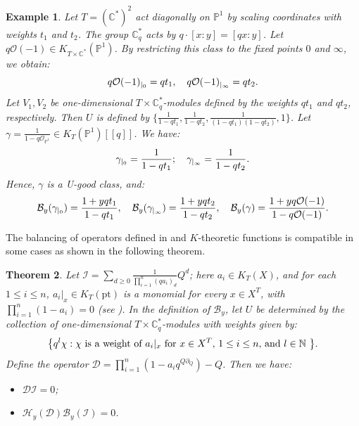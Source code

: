 \documentclass{amsart}
\newtheorem{thm}{Theorem}[section]
\newtheorem{example}[thm]{Example}
\begin{document}
\begin{example}
    Let $T=(\mathbb{C}^*)^2$ act diagonally on $\mathbb{P}^1$ by scaling coordinates with weights $t_1$ and $t_2$. The group $\mathbb{C}^*_q$ acts by $q \cdot [x:y] = [qx:y]$. Let $q\mathcal{O}(-1) \in K_{T \times \mathbb{C}^*}(\mathbb{P}^1)$. By restricting this class to the fixed points $0$ and $\infty$, we obtain:
    \[
     q\mathcal{O}(-1)_{{\arrowvert}_0} = qt_1, \quad q\mathcal{O}(-1)_{{\arrowvert}_{\infty}} = qt_2.
    \]
     Let $V_1, V_2$ be one-dimensional $T \times \mathbb{C}^*_q$-modules defined by the weights $qt_1$ and $qt_2$, respectively. 
    Then $U$ is defined by $\{ \frac{1}{1-qt_1}, \frac{1}{1-qt_2} ,\frac{1}{(1-qt_1)(1-qt_2)},1 \}$. Let $\gamma = \frac{1}{1-q\mathcal{O}_{\mathbb{P}^1}} \in K_{T}(\mathbb{P}^1)[[q]]$. We have:
    \[
    \gamma_{{\arrowvert}_{0}} = \frac{1}{1-qt_1}; \quad \gamma_{{\arrowvert}_{\infty}} = \frac{1}{1-qt_2}.
    \]
    Hence, $\gamma$ is a U-good class, and:
    \[
    \mathcal{B}_y(\gamma_{{\arrowvert}_{0}}) = \frac{1+yqt_1}{1-qt_1}, \quad \mathcal{B}_y(\gamma_{{\arrowvert}_{\infty}}) = \frac{1+yqt_2}{1-qt_2}, \quad \mathcal{B}_y(\gamma) = \frac{1 +yq\mathcal{O}(-1)}{1-q\mathcal{O}(-1)}.
    \]
\end{example}
The balancing of operators defined in  and $K$-theoretic functions is compatible in some cases as shown in the following theorem.
       \begin{thm}
    Let $\mathcal{I} = \sum_{d \geq 0}\frac{1}{\prod_{i=1}^n(qa_i)_d}Q^d$; here $a_i \in K_T(X)$, and for each $1 \leq i \leq n$, $a_i|_{x} \in K_{T}(\mathrm{pt})$ is a monomial for every $x \in X^T$, with $\prod_{i=1}^n(1-a_i) = 0$ (see ). In the definition of $\mathcal{B}_y$, let $U$ be determined by the collection of one-dimensional $T \times \mathbb{C}^*_q$-modules with weights given by:
        \[
        \big\{q^l \chi: \text{$\chi$ is a weight of $a_{i}\arrowvert_x$ for $x \in X^T$, $1 \leq i \leq n$, and $l \in \mathbb{N}$ }\big\}.
        \] 
        Define the operator $\mathcal{D} =\prod_{i=1}^n (1-a_iq^{Q\partial _Q})-Q$. Then we have:
    \begin{itemize}
        \item $\mathcal{D} \mathcal{I} = 0$;
        \item $\mathcal{H}_y(\mathcal{D}) \mathcal{B}_y(\mathcal{I})=0$.
    \end{itemize}
\end{thm}
\end{document}
